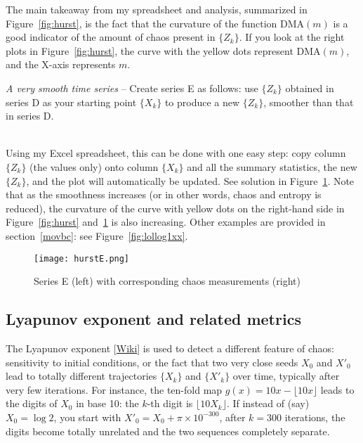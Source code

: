 \documentclass[oneside,10pt]{book}
\begin{document}
The main takeaway from my spreadsheet and analysis, summarized in Figure~\ref{fig:hurst}, is the fact that the curvature
 of the function $\text{DMA}(m)$ is a good indicator of the amount of chaos present in $\{Z_k\}$. If you look at the right plots in Figure~\ref{fig:hurst}, the curve with the yellow dots represent $\text{DMA}(m)$, and the X-axis represents $m$.




\begin{Exercise} {\em A very smooth time series} -- Create series E as follows: use $\{Z_k\}$ obtained in series D as your starting point $\{X_k\}$ to produce a new $\{Z_k\}$, smoother than that  in series D. \vspace{1ex} 

 \\
Using my Excel spreadsheet, this can be done with one easy step: copy column $\{Z_k\}$ (the values only) onto column $\{X_k\}$ and all the summary
 statistics, the new $\{Z_k\}$, and the plot will automatically be updated. See solution in Figure~\ref{fig:hurst2}. Note that as the smoothness
 increases (or in other words, chaos and entropy is reduced), the curvature of  the curve with yellow dots on the right-hand side in Figure~\ref{fig:hurst} and~\ref{fig:hurst2} is also increasing. Other examples are provided in section~\ref{movbc}: see Figure~\ref{fig:lollog1xx}.
\end{Exercise}

\begin{figure}[H]
\centering
\texttt{[image: hurstE.png]}  %
\caption{Series E (left) with corresponding chaos measurements (right)}
\label{fig:hurst2}
\end{figure}

\subsection{Lyapunov exponent and related metrics}\label{fredur}

The \textcolor{index}{Lyapunov exponent} [\href{https://en.wikipedia.org/wiki/Lyapunov_exponent}{Wiki}] is used to detect a different feature of chaos: sensitivity to initial conditions, or the fact that
  two very close seeds $X_0$ and $X'_0$ lead to totally different trajectories $\{X_k\}$ and $\{X'_k\}$ over time, typically after
 very few iterations. For instance, the \textcolor{index}{ten-fold map} $g(x)=10 x - \lfloor 10 x\rfloor$ leads to the digits of $X_0$ in base 10: the $k$-th digit is $\lfloor 10 X_k\rfloor$. If instead of (say) $X_0=\log 2$, you start with $X'_0 = X_0 + \pi \times 10^{-300}$, after $k=300$ iterations, the digits become totally unrelated and the two sequences completely separate.
\end{document}
